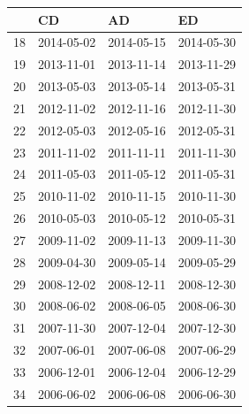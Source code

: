 \begin{table}[H]
\centering
\begin{tabular}{llll}
\hline
 & CD & AD & ED \\ 
\hline 
18 & 2014-05-02 & 2014-05-15 & 2014-05-30 \\ 
19 & 2013-11-01 & 2013-11-14 & 2013-11-29 \\ 
20 & 2013-05-03 & 2013-05-14 & 2013-05-31 \\ 
21 & 2012-11-02 & 2012-11-16 & 2012-11-30 \\ 
22 & 2012-05-03 & 2012-05-16 & 2012-05-31 \\ 
23 & 2011-11-02 & 2011-11-11 & 2011-11-30 \\ 
24 & 2011-05-03 & 2011-05-12 & 2011-05-31 \\ 
25 & 2010-11-02 & 2010-11-15 & 2010-11-30 \\ 
26 & 2010-05-03 & 2010-05-12 & 2010-05-31 \\ 
27 & 2009-11-02 & 2009-11-13 & 2009-11-30 \\ 
28 & 2009-04-30 & 2009-05-14 & 2009-05-29 \\ 
29 & 2008-12-02 & 2008-12-11 & 2008-12-30 \\ 
30 & 2008-06-02 & 2008-06-05 & 2008-06-30 \\ 
31 & 2007-11-30 & 2007-12-04 & 2007-12-30 \\ 
32 & 2007-06-01 & 2007-06-08 & 2007-06-29 \\ 
33 & 2006-12-01 & 2006-12-04 & 2006-12-29 \\ 
34 & 2006-06-02 & 2006-06-08 & 2006-06-30 \\ 
\hline
\end{tabular}
\end{table}



